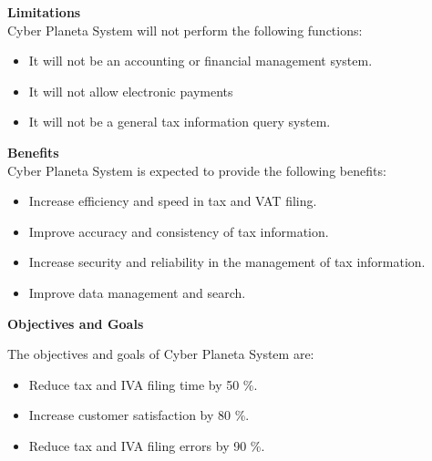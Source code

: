 \documentclass[12pt,a4paper, twosite]{article}
\begin{document}
\textbf{Limitations}
\\
Cyber Planeta System will not perform the following functions:
\begin{itemize}
    \item It will not be an accounting or financial management system.
     \item It will not allow electronic payments
     \item It will not be a general tax information query system.
\end{itemize}

\textbf{Benefits}
\\
Cyber Planeta System is expected to provide the following benefits:
\begin{itemize}
    \item Increase efficiency and speed in tax and VAT filing.
    \item Improve accuracy and consistency of tax information.
    \item Increase security and reliability in the management of tax information.
    \item Improve data management and search.    
\end{itemize}


\textbf{Objectives and Goals}

The objectives and goals of Cyber Planeta System are:
\begin{itemize}
    \item Reduce tax and IVA filing time by 50 \%.
    \item Increase customer satisfaction by 80 \%.
    \item Reduce tax and IVA filing errors by 90 \%.    
\end{itemize}
\end{document}
